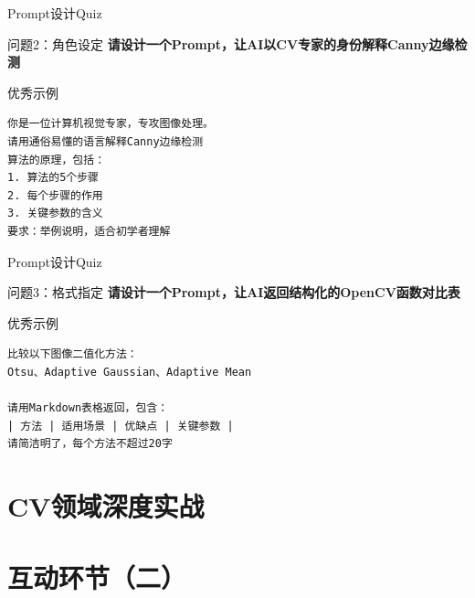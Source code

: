 \documentclass[aspectratio=169, 10pt]{beamer}
\begin{document}
\begin{frame}[fragile]{Prompt设计Quiz}
	\begin{block}{问题2：角色设定}
		\textbf{请设计一个Prompt，让AI以CV专家的身份解释Canny边缘检测}
	\end{block}

	\vspace{0.5cm}

	\begin{exampleblock}{优秀示例}
		\small
		\begin{verbatim}
你是一位计算机视觉专家，专攻图像处理。
请用通俗易懂的语言解释Canny边缘检测
算法的原理，包括：
1. 算法的5个步骤
2. 每个步骤的作用
3. 关键参数的含义
要求：举例说明，适合初学者理解
		\end{verbatim}
	\end{exampleblock}
\end{frame}

\begin{frame}[fragile]{Prompt设计Quiz}
	\begin{block}{问题3：格式指定}
		\textbf{请设计一个Prompt，让AI返回结构化的OpenCV函数对比表}
	\end{block}

	\vspace{0.5cm}

	\begin{exampleblock}{优秀示例}
		\small
		\begin{verbatim}
比较以下图像二值化方法：
Otsu、Adaptive Gaussian、Adaptive Mean

请用Markdown表格返回，包含：
| 方法 | 适用场景 | 优缺点 | 关键参数 |
请简洁明了，每个方法不超过20字
		\end{verbatim}
	\end{exampleblock}
\end{frame}

\section{CV领域深度实战}


\section{互动环节（二）}
\end{document}
